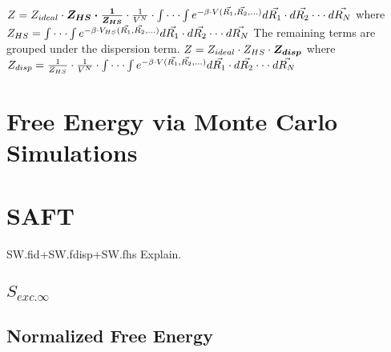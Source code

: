 $\newline Z=Z_{ideal}\cdot \boldsymbol{Z_{HS}\cdot \frac{1}{Z_{HS}}}\cdot \frac{1}{V^N}\cdot \int\cdot\cdot\cdot\int e^{-\beta\cdot V(\vec{R_1},\vec{R_2},...)}d\vec{R_1}\cdot d\vec{R_2}\cdot\cdot\cdot d\vec{R_N}\newline$
where $Z_{HS}=\int\cdot\cdot\cdot\int e^{-\beta\cdot V_{HS}(\vec{R_1},\vec{R_2},...)}d\vec{R_1}\cdot d\vec{R_2}\cdot\cdot\cdot d\vec{R_N}\newline$
The remaining terms are grouped under the dispersion term.
$\newline Z=Z_{ideal}\cdot Z_{HS}\cdot \boldsymbol{Z_{disp}}\newline$
where $Z_{disp}= \frac{1}{Z_{HS}}\cdot \frac{1}{V^N}\cdot \int\cdot\cdot\cdot\int e^{-\beta\cdot V(\vec{R_1},\vec{R_2},...)}d\vec{R_1}\cdot d\vec{R_2}\cdot\cdot\cdot d\vec{R_N}\newline$

\section{Free Energy via Monte Carlo Simulations}
\section{SAFT}
SW.fid+SW.fdisp+SW.fhs Explain.

\subsection{$S_{exc.\infty}$}

\subsection{Normalized Free Energy}


